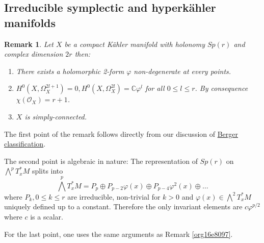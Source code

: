 \documentclass[11pt]{article}
\newtheorem{remark}{Remark}
\begin{document}
\subsection{Irreducible symplectic and hyperkähler manifolds}
\label{sec:orgb162bf1}
\begin{remark}
Let \(X\) be a compact Kähler manifold with holonomy \(Sp(r)\) and complex dimension \(2r\) then:
\begin{enumerate}
\item There exists a holomorphic 2-form \(\varphi\) non-degenerate at every points.
\item \(H^0(X,\Omega_X^{2l+1}) = 0, H^0(X,\Omega_X^{2l})=\mathbb{C}\varphi^l\) for all \(0\leq l\leq
   r\). By consequence \(\chi(\mathcal{O}_X)=r+1\).
\item \(X\) is simply-connected.
\end{enumerate}
\end{remark}

The first point of the remark follows directly from our discussion of \href{Berger-remark-complex.org}{Berger classification}. 

The second point is algebraic in nature: The representation of \(Sp(r)\) on \(\bigwedge^p T^*_xM\) splits
into 
\begin{equation}
\label{eq:decomp-varphi}
\bigwedge^p T^*_xM = P_p \oplus P_{p-2}\varphi(x) \oplus P_{p-4}\varphi^2(x)\oplus \dots
\end{equation}
where \(P_k, 0\leq k\leq r\) are irreducible, non-trivial for \(k>0\) and \(\varphi(x)\in\bigwedge^2
T^*_xM\) uniquely defined up to a constant. Therefore the only invariant elements are
\(c\varphi^{p/2}\) where \(c\) is a scalar.

For the last point, one uses the same arguments as Remark \ref{org16e8097}.
\end{document}
